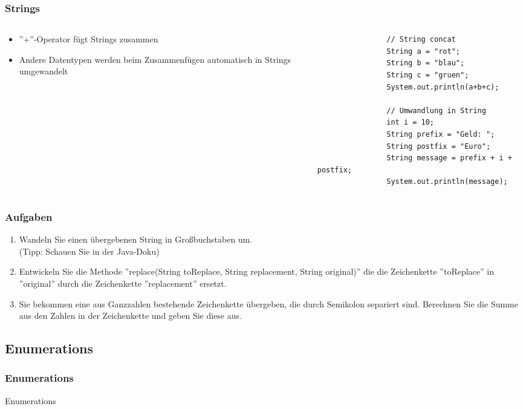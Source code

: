 \begin{frame}[fragile]
	  \frametitle{Strings}
		 \begin{columns}
		 \begin{column}{0.5\textwidth}
			  \small
			  \begin{itemize}
			    \item ''+''-Operator f\"ugt Strings zusammen
			    \item Andere Datentypen werden beim
			    Zusammenf\"ugen automatisch
			    in Strings umgewandelt
			  \end{itemize}
		 \end{column}
		 \begin{column}{0.5\textwidth}
		 	\begin{lstlisting}
		 		// String concat
		 		String a = "rot";
		 		String b = "blau";
		 		String c = "gruen";
		 		System.out.println(a+b+c);
		 		
		 		// Umwandlung in String
		 		int i = 10;
		 		String prefix = "Geld: ";
		 		String postfix = "Euro";
		 		String message = prefix + i + postfix;
		 		System.out.println(message);
		 	\end{lstlisting}
		 \end{column}
		 \end{columns}
\end{frame}

\begin{frame}
	\frametitle{Aufgaben}
	\begin{enumerate}
	  \item Wandeln Sie einen übergebenen String in Großbuchstaben um.
	  \\(Tipp: Schauen Sie in der Java-Doku)
	  \item Entwickeln Sie die Methode ''replace(String toReplace, String
	  replacement, String original)'' die die Zeichenkette ''toReplace'' in
	  ''original'' durch die Zeichenkette ''replacement'' ersetzt.
	  \item Sie bekommen eine aus Ganzzahlen bestehende Zeichenkette übergeben, die
	  durch Semikolon separiert sind. Berechnen Sie die Summe aus den Zahlen in der
	  Zeichenkette und geben Sie diese aus.
	\end{enumerate}
\end{frame}

\subsection{Enumerations}
\begin{frame}[fragile]
	\frametitle{Enumerations}
	\huge Enumerations
\end{frame}

